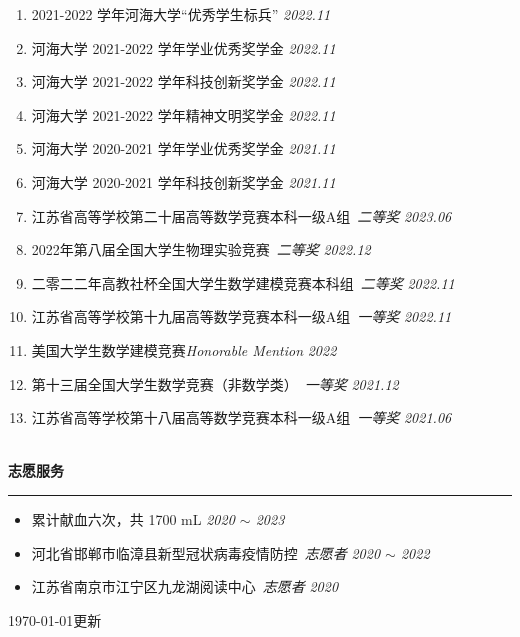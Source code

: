 \documentclass[12pt]{article}
\renewcommand*{\section}[1]{
    ~\\ \noindent \textbf{#1} \medskip \hrule \medskip
}
\begin{document}
\begin{enumerate}
    \item 2021-2022 学年河海大学“优秀学生标兵” \hfill \textit{2022.11}
    \item 河海大学 2021-2022 学年学业优秀奖学金 \hfill \textit{2022.11}
    \item 河海大学 2021-2022 学年科技创新奖学金 \hfill \textit{2022.11}
    \item 河海大学 2021-2022 学年精神文明奖学金 \hfill \textit{2022.11}
    \item 河海大学 2020-2021 学年学业优秀奖学金 \hfill \textit{2021.11}
    \item 河海大学 2020-2021 学年科技创新奖学金 \hfill \textit{2021.11}
          \\
    \item 江苏省高等学校第二十届高等数学竞赛本科一级A组\ \textit{二等奖} \hfill \textit{2023.06}
    \item 2022年第八届全国大学生物理实验竞赛\ \textit{二等奖} \hfill \textit{2022.12}
    \item 二零二二年高教社杯全国大学生数学建模竞赛本科组\ \textit{二等奖} \hfill \textit{2022.11}
    \item 江苏省高等学校第十九届高等数学竞赛本科一级A组\ \textit{一等奖} \hfill \textit{2022.11}
    \item 美国大学生数学建模竞赛\textit{Honorable Mention} \hfill \textit{2022}
    \item 第十三届全国大学生数学竞赛（非数学类）\ \textit{一等奖} \hfill \textit{2021.12}
    \item 江苏省高等学校第十八届高等数学竞赛本科一级A组\ \textit{一等奖} \hfill \textit{2021.06}
\end{enumerate}


\section{志愿服务}

\begin{itemize}[noitemsep,nolistsep]
    \item 累计献血六次，共 1700 mL \hfill \textit{2020 $\sim$ 2023}
    \item 河北省邯郸市临漳县新型冠状病毒疫情防控\ \textit{志愿者} \hfill \textit{2020 $\sim$ 2022}
    \item 江苏省南京市江宁区九龙湖阅读中心\ \textit{志愿者} \hfill \textit{2020}
\end{itemize}

\hfill {\tiny \today 更新}
\end{document}
